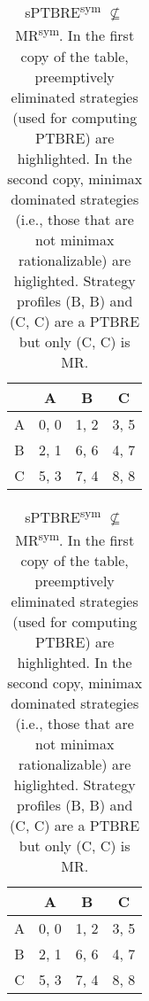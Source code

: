 \begin{table}
	\caption{
		sPTBRE\textsuperscript{sym} $\not\subseteq$ MR\textsuperscript{sym}.
		In the first copy of the table, preemptively eliminated strategies (used for computing PTBRE) are highlighted.
		In the second copy, minimax dominated strategies (i.e., those that are not minimax rationalizable) are higlighted.
		Strategy profiles (B, B) and (C, C) are a PTBRE but only (C, C) is MR.
	}
	\label{tab:sym-ptbre-ne-mr}
	\centering
	\begin{tabular}{|c|c|c|c|}
		\hline
			& A		& B	   & C	  \\
		\hline
		A 		&\cellcolor{gray!70} 0, 0 &\cellcolor{gray!70} 1, 2 &\cellcolor{gray!70} 3, 5 \\
		\hline
		B		&\cellcolor{gray!70} 2, 1 &\cellcolor{gray!20} 6, 6 &\cellcolor{gray!70} 4, 7 \\
		\hline
		C		&\cellcolor{gray!70} 5, 3 &\cellcolor{gray!70} 7, 4 &\cellcolor{gray!00} 8, 8 \\
		\hline
	\end{tabular}
	\hspace{1em}
	\begin{tabular}{|c|c|c|c|}
		\hline
			& A		& B	   & C	  \\
		\hline
		A 		&\cellcolor{gray!70} 0, 0 &\cellcolor{gray!70} 1, 2 &\cellcolor{gray!70} 3, 5 \\
		\hline
		B		&\cellcolor{gray!70} 2, 1 &\cellcolor{gray!20} 6, 6 &\cellcolor{gray!20} 4, 7 \\
		\hline
		C		&\cellcolor{gray!70} 5, 3 &\cellcolor{gray!20} 7, 4 &\cellcolor{gray!00} 8, 8 \\
		\hline
	\end{tabular}
\end{table}

